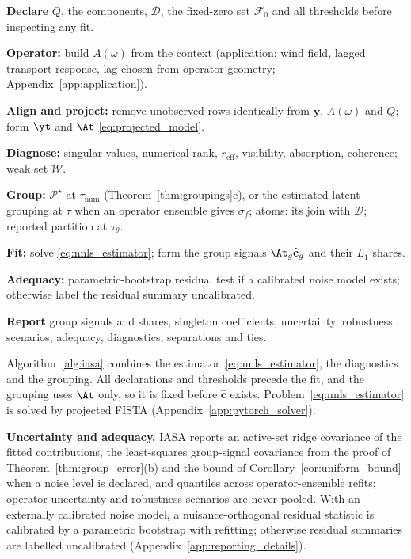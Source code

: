 \begin{algorithm}[t]
\caption{Identifiability-Aware Source Attribution (IASA)}
\label{alg:iasa}
\footnotesize
\begin{algsteps}
  \item \textbf{Declare} \(Q\), the components, \(\mathcal D\), the fixed-zero set
  \(\mathcal F_0\) and all thresholds before inspecting any fit.
  \item \textbf{Operator:} build \(A(\omega)\) from the context (application: wind
  field, lagged transport response, lag chosen from operator geometry;
  Appendix~\ref{app:application}).
  \item \textbf{Align and project:} remove unobserved rows identically from
  \(\mathbf y\), \(A(\omega)\) and \(Q\); form \(\yt\) and \(\At\)
  \eqref{eq:projected_model}.
  \item \textbf{Diagnose:} singular values, numerical rank, \(r_{\mathrm{eff}}\),
  visibility, absorption, coherence; weak set \(\mathcal W\).
  \item \textbf{Group:} \(\mathcal P^\star\) at \(\tau_{\mathrm{num}}\)
  (Theorem~\ref{thm:groupings}c), or the estimated latent grouping at \(\tau\) when an
  operator ensemble gives \(\sigma_f\); atoms: its join with \(\mathcal D\); reported
  partition at \(\tau_\theta\).
  \item \textbf{Fit:} solve \eqref{eq:nnls_estimator}; form the group signals
  \(\At_g\widehat{\mathbf c}_g\) and their \(L_1\) shares.
  \item \textbf{Adequacy:} parametric-bootstrap residual test if a calibrated noise
  model exists; otherwise label the residual summary uncalibrated.
  \item \textbf{Report} group signals and shares, singleton coefficients,
  uncertainty, robustness scenarios, adequacy, diagnostics, separations and ties.
\end{algsteps}
\end{algorithm}

Algorithm~\ref{alg:iasa} combines the estimator~\eqref{eq:nnls_estimator}, the
diagnostics and the grouping.  All declarations and thresholds precede the fit, and
the grouping uses \(\At\) only, so it is fixed before \(\widehat{\mathbf c}\) exists.
Problem~\eqref{eq:nnls_estimator} is solved by projected FISTA \citep{beck2009fast}
(Appendix~\ref{app:pytorch_solver}).

\noindent\textbf{Uncertainty and adequacy.}
IASA reports an active-set ridge covariance of the fitted contributions, the
least-squares group-signal covariance from the proof of Theorem~\ref{thm:group_error}(b) and the bound
of Corollary~\ref{cor:uniform_bound} when a noise level is declared, and quantiles across operator-ensemble refits; operator uncertainty and
robustness scenarios are never pooled.  With an externally calibrated noise model, a
nuisance-orthogonal residual statistic is calibrated by a parametric bootstrap with
refitting; otherwise residual summaries are labelled uncalibrated
(Appendix~\ref{app:reporting_details}).

